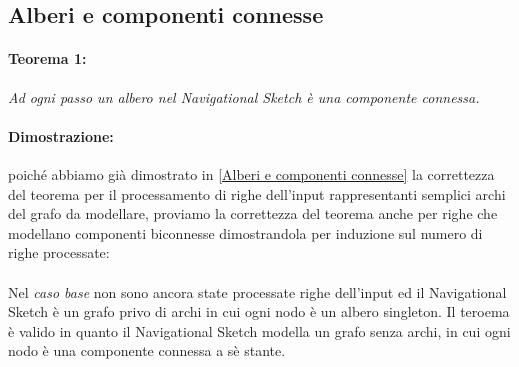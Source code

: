 \documentclass[a4paper,11pt]{report}
\begin{document}
\subsection{Alberi e componenti connesse}
\paragraph{Teorema 1:}\emph{Ad ogni passo un albero nel \emph{Navigational Sketch} è una componente connessa.}
\paragraph{Dimostrazione:} poiché abbiamo già dimostrato in \ref{Alberi e componenti connesse} la correttezza del teorema per il
processamento di righe dell'input rappresentanti semplici archi del grafo da modellare,
 proviamo la correttezza del teorema anche per righe che modellano componenti biconnesse dimostrandola per induzione sul numero di righe
processate:
\paragraph{}
Nel \emph{caso base} non sono ancora state processate righe dell'input ed il Navigational Sketch è un grafo privo di archi in cui ogni nodo
è un albero singleton. Il teroema è valido in quanto 
il Navigational Sketch modella un grafo senza archi, in cui ogni nodo è una componente connessa a sè stante. 
\end{document}
